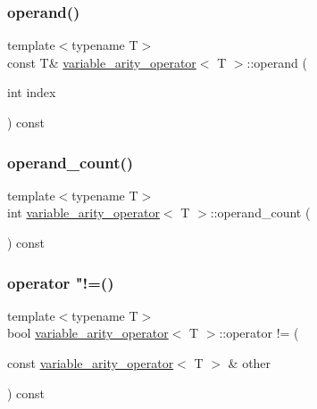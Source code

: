 \subsubsection{\texorpdfstring{operand()}{operand()}\hspace{0.1cm}{\footnotesize\ttfamily [2/2]}}
{\footnotesize\ttfamily template$<$typename T$>$ \\
const T\& \mbox{\hyperlink{classvariable__arity__operator}{variable\+\_\+arity\+\_\+operator}}$<$ T $>$\+::operand (\begin{DoxyParamCaption}\item[{int}]{index }\end{DoxyParamCaption}) const\hspace{0.3cm}{\ttfamily [inline]}}

\mbox{\label{classvariable__arity__operator_a8a174af98c61f22a922c9ddf1ff32434}} 
\subsubsection{\texorpdfstring{operand\_count()}{operand\_count()}}
{\footnotesize\ttfamily template$<$typename T$>$ \\
int \mbox{\hyperlink{classvariable__arity__operator}{variable\+\_\+arity\+\_\+operator}}$<$ T $>$\+::operand\+\_\+count (\begin{DoxyParamCaption}{ }\end{DoxyParamCaption}) const\hspace{0.3cm}{\ttfamily [inline]}}

\mbox{\label{classvariable__arity__operator_ab9a37ed2600d3a1778a1179dadb2f74c}} 
\subsubsection{\texorpdfstring{operator "!=()}{operator !=()}}
{\footnotesize\ttfamily template$<$typename T$>$ \\
bool \mbox{\hyperlink{classvariable__arity__operator}{variable\+\_\+arity\+\_\+operator}}$<$ T $>$\+::operator != (\begin{DoxyParamCaption}\item[{const \mbox{\hyperlink{classvariable__arity__operator}{variable\+\_\+arity\+\_\+operator}}$<$ T $>$ \&}]{other }\end{DoxyParamCaption}) const\hspace{0.3cm}{\ttfamily [inline]}}

